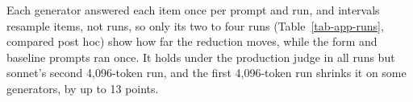 Each generator answered each item once per prompt and run, and intervals
resample items, not runs, so only its two to four runs
(Table~\ref{tab-app-runs}, compared post hoc) show how far the reduction moves,
while the form and baseline prompts ran once.
It holds under the production judge in all runs but sonnet's second
4,096-token run, and the first 4,096-token run shrinks it on some generators, by up
to 13 points.

